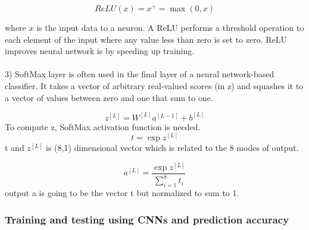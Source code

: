 \begin{equation}
ReLU(x) = x^{+} = \max(0,x) 
\end{equation}

where $x$ is the input data to a neuron. A ReLU performs a threshold operation
to each element of the input where any value less than zero is set to zero. ReLU improves neural network is by speeding up training.
\\
\\
3) SoftMax layer \cite{Ref26} is often used in the final layer of a neural network-based classifier.  It takes a vector of arbitrary real-valued scores (in z) and squashes it to a vector of values between zero and one that sum to one.

\begin{equation}
z^{[L]}=W^{[L]}a^{[L-1]}+b^{[L]} 
\end{equation}
To compute z, SoftMax activation function is needed.
\begin{equation}
t = \exp z^{[L]}
\end{equation}
t and $z^{[L]}$ is (8,1) dimensional vector which is related to the 8 modes of output.

\begin{equation}
a^{[L]} = \frac{\exp z^{[L]}}{\sum_{i=1}^{8} t_i} 
\end{equation}
output a is going to be the vector t but normalized to sum to 1.



\subsubsection{Training and testing using CNNs and prediction accuracy}
\label{subsubsec3}

